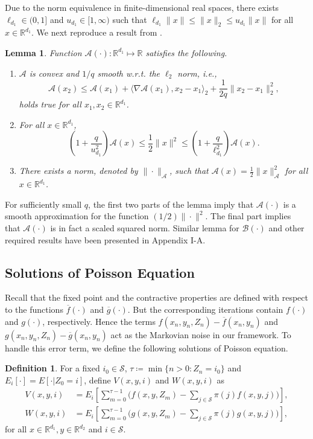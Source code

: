 \documentclass[letterpaper, 10 pt, conference]{ieeeconf}  %
\theoremstyle{definition}
\newtheorem{definition}{Definition}
\theoremstyle{plain}
\newtheorem{lemma}{Lemma}
\newcommand{\barf}{\overline{f}}
\newcommand{\barg}{\overline{g}}
\newcommand{\Scal}{\mathcal{S}}
\newcommand{\RR}{\mathbb{R}}
\newcommand{\Acal}{\mathcal{A}}
\newcommand{\Bcal}{\mathcal{B}}
\begin{document}
Due to the norm equivalence in finite-dimensional real spaces, there exists $\ell_{d_1}\in(0,1]$ and $u_{d_1}\in[1,\infty)$ such that $\ell_{d_1}\|x\|\leq \|x\|_2\leq u_{d_1}\|x\|$ for all $x\in\RR^{d_1}$. We next reproduce a result from \cite{chenfinite}.
\begin{lemma}\label{lemma:chen-A}
    Function $\Acal(\cdot):\RR^{d_1}\mapsto\RR$ satisfies the following.
    \begin{enumerate}[label=(\alph*)]
        \item $\Acal$ is convex and $1/q$ smooth w.r.t. the $\ell_2$ norm, i.e.,
        $$\Acal(x_2)\leq \Acal(x_1)+\langle\nabla \Acal(x_1), x_2-x_1\rangle_2 + \frac{1}{2q}\|x_2-x_1\|^2_2, $$
        holds true for all $x_1,x_2\in\RR^{d_1}$.
        \item For all $x\in\RR^{d_1}$, $$\left(1+\frac{q}{u_{d_1}^2}\right)\Acal(x)\leq \frac{1}{2}\|x\|^2\leq \left(1+\frac{q}{\ell_{d_1}^2}\right)\Acal(x).$$
        \item There exists a norm, denoted by $\|\cdot\|_\Acal$, such that $\Acal(x)=\frac{1}{2}\|x\|_\Acal^2$ for all $x\in\RR^{d_1}$. 
    \end{enumerate}
\end{lemma}
For sufficiently small $q$, the first two parts of the lemma imply that $\Acal(\cdot)$ is a smooth approximation for the function $(1/2)\|\cdot\|^2$. The final part implies that $\Acal(\cdot)$ is in fact a scaled squared norm. Similar lemma for $\Bcal(\cdot)$ and other required results have been presented in Appendix I-A.

\subsection{Solutions of Poisson Equation}
Recall that the fixed point and the contractive properties are defined with respect to the functions $\barf(\cdot)$ and $\barg(\cdot)$. But the corresponding iterations contain $f(\cdot)$ and $g(\cdot)$, respectively. Hence the terms $f(x_n,y_n,Z_n)-\barf(x_n,y_n)$ and $g(x_n,y_n,Z_n)-\barg(x_n,y_n)$ act as the Markovian noise in our framework. To handle this error term, we define the following solutions of Poisson equation.
\begin{definition}\label{defn:VandW}
    For a fixed $i_0\in\Scal$, $\tau\coloneqq \min\{n>0: \!Z_n=i_0\}$ and $E_i[\cdot]=E[\cdot|Z_0=i]$, define $V(x,y,i)$ and $W(x,y,i)$ as
    \begin{align*}
        V(x,y,i)&=E_i\left[\sum_{m=0}^{\tau-1}\Big(f(x,y,Z_m)-\sum_{j\in\Scal}\pi(j)f(x,y,j)\Big)\right],\\
        W(x,y,i)&=E_i\left[\sum_{m=0}^{\tau-1}\Big(g(x,y,Z_m)-\sum_{j\in\Scal}\pi(j)g(x,y,j)\Big)\right],
    \end{align*}
for all $x\in\RR^{d_1},y\in\RR^{d_2}$ and $i\in\Scal$.
\end{definition}
\end{document}
